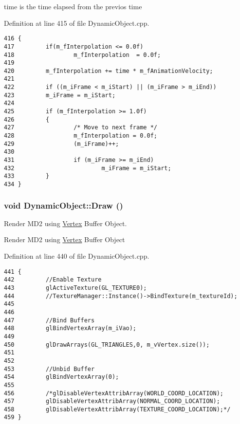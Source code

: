 time is the time elapsed from the previos time 

Definition at line 415 of file DynamicObject.cpp.

\begin{Code}\begin{verbatim}416 {
417         if(m_fInterpolation <= 0.0f)
418                 m_fInterpolation  = 0.0f;
419         
420         m_fInterpolation += time * m_fAnimationVelocity;
421 
422         if ((m_iFrame < m_iStart) || (m_iFrame > m_iEnd))
423         m_iFrame = m_iStart;
424 
425         if (m_fInterpolation >= 1.0f)
426         {
427                 /* Move to next frame */
428                 m_fInterpolation = 0.0f;
429                 (m_iFrame)++;
430 
431                 if (m_iFrame >= m_iEnd)
432                         m_iFrame = m_iStart;
433         }
434 }
\end{verbatim}
\end{Code}


\hypertarget{class_dynamic_object_2730ff294914d7fe0a66bad8378bcda8}{
\subsubsection[Draw]{\setlength{\rightskip}{0pt plus 5cm}void DynamicObject::Draw ()}}
\label{class_dynamic_object_2730ff294914d7fe0a66bad8378bcda8}


Render MD2 using \hyperlink{class_vertex}{Vertex} Buffer Object. 

Render MD2 using \hyperlink{class_vertex}{Vertex} Buffer Object 

Definition at line 440 of file DynamicObject.cpp.

\begin{Code}\begin{verbatim}441 {
442         //Enable Texture
443         glActiveTexture(GL_TEXTURE0);
444         //TextureManager::Instance()->BindTexture(m_textureId);
445 
446 
447         //Bind Buffers
448         glBindVertexArray(m_iVao);
449         
450         glDrawArrays(GL_TRIANGLES,0, m_vVertex.size());
451 
452 
453         //Unbid Buffer
454         glBindVertexArray(0);
455 
456         /*glDisableVertexAttribArray(WORLD_COORD_LOCATION);
457         glDisableVertexAttribArray(NORMAL_COORD_LOCATION);
458         glDisableVertexAttribArray(TEXTURE_COORD_LOCATION);*/
459 }
\end{verbatim}
\end{Code}



